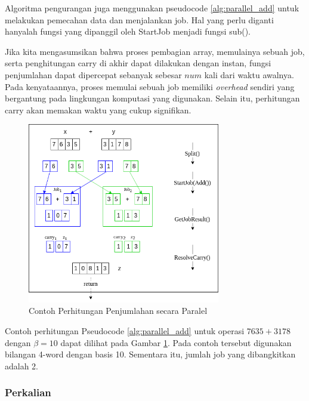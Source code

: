       Algoritma pengurangan juga menggunakan pseudocode \ref{alg:parallel_add} untuk melakukan pemecahan data dan menjalankan job. Hal yang perlu diganti hanyalah fungsi yang dipanggil oleh StartJob menjadi fungsi sub().

      Jika kita mengasumsikan bahwa proses pembagian array, memulainya sebuah job, serta penghitungan carry di akhir dapat dilakukan dengan instan, fungsi penjumlahan dapat dipercepat sebanyak sebesar $num$ kali dari waktu awalnya. Pada kenyataannya, proses memulai sebuah job memiliki \textit{overhead} sendiri yang bergantung pada lingkungan komputasi yang digunakan. Selain itu, perhitungan carry akan memakan waktu yang cukup signifikan.

      \begin{figure}
          \centering
          \includegraphics[width=0.75\textwidth]{resources/img/ch-3/add-example.png}
          \caption{Contoh Perhitungan Penjumlahan secara Paralel}
          \label{fig:add_par_example}
      \end{figure}

      Contoh perhitungan Pseudocode \ref{alg:parallel_add} untuk operasi $7635+3178$ dengan $\beta = 10$ dapat dilihat pada Gambar \ref{fig:add_par_example}. Pada contoh tersebut digunakan bilangan 4-word dengan basis 10. Sementara itu, jumlah job yang dibangkitkan adalah 2.


    \subsubsection{Perkalian} \label{sec:mul_parallel}

